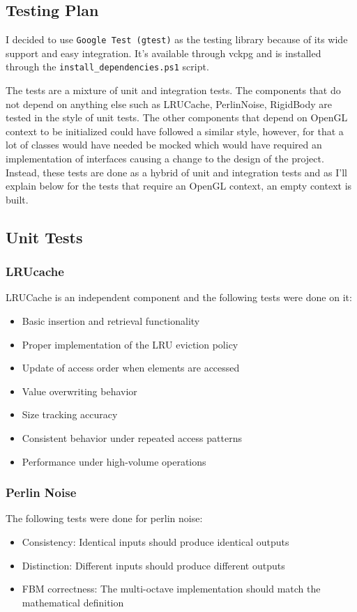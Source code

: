 \subsection{Testing Plan}

I decided to use \texttt{Google Test (gtest)} as the testing library because of its wide support and easy integration. It's available through vckpg and is installed through the \texttt{install\_dependencies.ps1} script.

The tests are a mixture of unit and integration tests. The components that do not depend on anything else such as LRUCache, PerlinNoise, RigidBody are tested in the style of unit tests. The other components that depend on OpenGL context to be initialized could have followed a similar style, however, for that a lot of classes would have needed be mocked which would have required an implementation of interfaces causing a change to the design of the project. Instead, these tests are done as a hybrid of unit and integration tests and as I'll explain below for the tests that require an OpenGL context, an empty context is built.

\subsection{Unit Tests}
\subsubsection{LRUcache}
LRUCache is an independent component and the following tests were done on it: 
\begin{itemize}
    \item Basic insertion and retrieval functionality
    \item Proper implementation of the LRU eviction policy
    \item Update of access order when elements are accessed
    \item Value overwriting behavior
    \item Size tracking accuracy
    \item Consistent behavior under repeated access patterns
    \item Performance under high-volume operations
\end{itemize}

\subsubsection{Perlin Noise}
The following tests were done for perlin noise:
\begin{itemize}
    \item Consistency: Identical inputs should produce identical outputs
    \item Distinction: Different inputs should produce different outputs
    \item FBM correctness: The multi-octave implementation should match the mathematical definition
\end{itemize}

